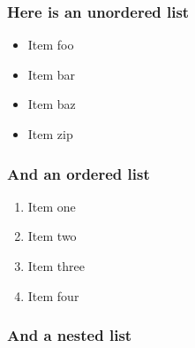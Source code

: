 \documentclass[a4paper,12pt]{article}
\providecommand{\tightlist}{%
  \setlength{\itemsep}{0pt}\setlength{\parskip}{0pt}}
\begin{document}
\hypertarget{here-is-an-unordered-list}{%
\subsubsection{Here is an unordered
list}\label{here-is-an-unordered-list}}

\begin{itemize}
\tightlist
\item
  Item foo
\item
  Item bar
\item
  Item baz
\item
  Item zip
\end{itemize}

\hypertarget{and-an-ordered-list}{%
\subsubsection{And an ordered list}\label{and-an-ordered-list}}

\begin{enumerate}
\def\labelenumi{\arabic{enumi}.}
\tightlist
\item
  Item one
\item
  Item two
\item
  Item three
\item
  Item four
\end{enumerate}

\hypertarget{and-a-nested-list}{%
\subsubsection{And a nested list}\label{and-a-nested-list}}
\end{document}
